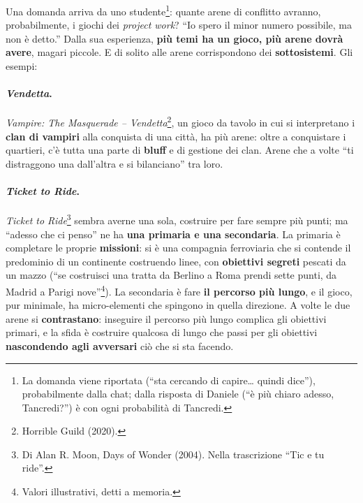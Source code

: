 Una domanda arriva da uno studente\footnote{La domanda viene riportata (``sta cercando di capire\ldots{}
quindi dice''), probabilmente dalla chat; dalla risposta di Daniele (``è più chiaro adesso,
Tancredi?'') è con ogni probabilità di Tancredi.}: quante arene di conflitto avranno, probabilmente,
i giochi dei \emph{project work}? ``Io spero il minor numero possibile, ma non è detto.'' Dalla sua
esperienza, \textbf{più temi ha un gioco, più arene dovrà avere}, magari piccole. E di solito alle
arene corrispondono dei \textbf{sottosistemi}. Gli esempi:

\paragraph{\emph{Vendetta}.} \emph{Vampire: The Masquerade -- Vendetta}\footnote{Horrible Guild
(2020).}, un gioco da tavolo in cui si interpretano i \textbf{clan di vampiri} alla conquista di una
città, ha più arene: oltre a conquistare i quartieri, c'è tutta una parte di \textbf{bluff} e di
gestione dei clan. Arene che a volte ``ti distraggono una dall'altra e si bilanciano'' tra loro.

\paragraph{\emph{Ticket to Ride}.} \emph{Ticket to Ride}\footnote{Di Alan R. Moon, Days of Wonder
(2004). Nella trascrizione ``Tic e tu ride''.} sembra averne una sola, costruire per fare sempre più
punti; ma ``adesso che ci penso'' ne ha \textbf{una primaria e una secondaria}. La primaria è
completare le proprie \textbf{missioni}: si è una compagnia ferroviaria che si contende il predominio
di un continente costruendo linee, con \textbf{obiettivi segreti} pescati da un mazzo (``se costruisci
una tratta da Berlino a Roma prendi sette punti, da Madrid a Parigi nove''\footnote{Valori
illustrativi, detti a memoria.}). La secondaria è fare \textbf{il percorso più lungo}, e il gioco,
pur minimale, ha micro-elementi che spingono in quella direzione. A volte le due arene si
\textbf{contrastano}: inseguire il percorso più lungo complica gli obiettivi primari, e la sfida è
costruire qualcosa di lungo che passi per gli obiettivi \textbf{nascondendo agli avversari} ciò che si
sta facendo.

